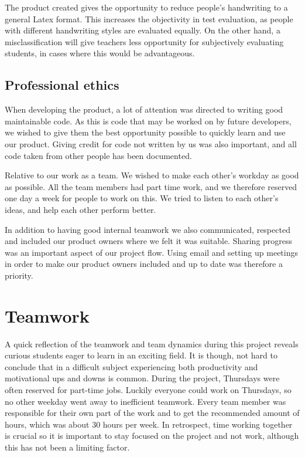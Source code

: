 The product created gives the opportunity to reduce people's handwriting to a general Latex format. This increases the objectivity in test evaluation, as people with different handwriting styles are evaluated equally. On the other hand, a misclassification will give teachers less opportunity for subjectively evaluating students, in cases where this would be advantageous.

\subsection{Professional ethics}

When developing the product, a lot of attention was directed to writing good maintainable code. As this is code that may be worked on by future developers, we wished to give them the best opportunity possible to quickly learn and use our product. Giving credit for code not written by us was also important, and all code taken from other people has been documented. 

Relative to our work as a team. We wished to make each other's workday as good as possible. All the team members had part time work, and we therefore reserved one day a week for people to work on this. We tried to listen to each other's ideas, and help each other perform better.

In addition to having good internal teamwork we also communicated, respected and included our product owners where we felt it was suitable. Sharing progress was an important aspect of our project flow. Using email and setting up meetings in order to make our product owners included and up to date was therefore a priority.

\section{Teamwork}
A quick reflection of the teamwork and team dynamics during this project reveals curious students eager to learn in an exciting field. It is though, not hard to conclude that in a difficult subject experiencing both productivity and motivational ups and downs is common. During the project, Thursdays were often reserved for part-time jobs. Luckily everyone could work on Thursdays, so no other weekday went away to inefficient teamwork. Every team member was responsible for their own part of the work and to get the recommended amount of hours, which was about 30 hours per week. In retrospect, time working together is crucial so it is important to stay focused on the project and not work, although this has not been a limiting factor.